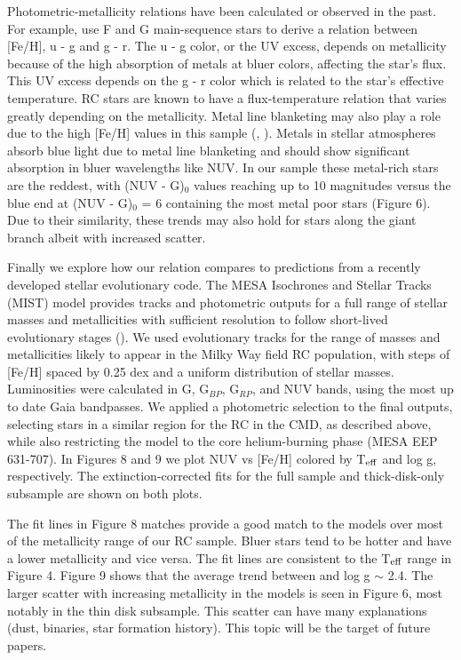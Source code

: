 \documentclass[twocolumn]{emulateapj}
\begin{document}
Photometric-metallicity relations have been calculated or observed in the past. For example, \citealt{ivezic2008} use F and G main-sequence stars to derive a relation between [Fe/H], u - g and g - r. The u - g color, or the UV excess, depends on metallicity because of the high absorption of metals at bluer colors, affecting the star's flux. This UV excess depends on the g - r color which is related to the star's effective temperature. RC stars are known to have a flux-temperature relation that varies greatly depending on the metallicity. Metal line blanketing may also play a role due to the high [Fe/H] values in this sample (\citealt{girardi16}, \citealt{choi16}). Metals in stellar atmospheres absorb blue light due to metal line blanketing and should show significant absorption in bluer wavelengths like NUV. In our sample these metal-rich stars are the reddest, with (NUV - G)$_0$ values reaching up to 10 magnitudes versus the blue end at (NUV - G)$_0$ = 6 containing the most metal poor stars (Figure 6). Due to their similarity, these trends may also hold for stars along the giant branch albeit with increased scatter.

Finally we explore how our relation compares to predictions from a recently developed stellar evolutionary code. The MESA Isochrones and Stellar Tracks (MIST) model provides tracks and photometric outputs for a full range of stellar masses and metallicities with sufficient resolution to follow short-lived evolutionary stages (\citealt{choi16}). We used evolutionary tracks for the range of masses and metallicities likely to appear in the Milky Way field RC population, with  steps of [Fe/H] spaced by 0.25 dex and a uniform distribution of stellar masses. Luminosities were calculated in G, G$_{BP}$, G$_{RP}$, and NUV bands, using the most up to date Gaia bandpasses. We applied a photometric selection to the final outputs, selecting stars in a similar region for the RC in the CMD, as described above, while also restricting the model to the core helium-burning phase (MESA EEP 631-707).   In Figures 8 and 9 we plot NUV vs [Fe/H] colored by T$_{\rm{eff}}$ and log g, respectively. The extinction-corrected fits for the full sample and thick-disk-only subsample are shown on both plots.

The fit lines in Figure 8 matches provide a good match to the models over most of the metallicity range of our RC sample. Bluer stars tend to be hotter and have a lower metallicity and vice versa. The fit lines are consistent to the T$_{\rm{eff}}$ range in Figure 4. Figure 9 shows that the average trend between  and log g $\sim$ 2.4. The larger scatter with increasing metallicity in the models is seen in Figure 6, most notably in the thin disk subsample. This scatter can have many explanations (dust, binaries, star formation history). This topic will be the target of future papers.
\end{document}
